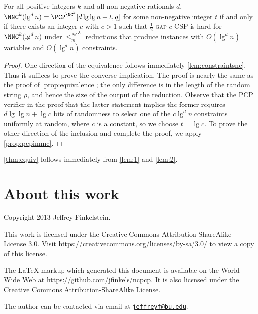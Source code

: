 \documentclass[]{article}
\newcommand{\email}[1]{\href{mailto:#1}{\nolinkurl{#1}}}
\begin{document}
\begin{lemma}\label{lem:2}
  For all positive integers $k$ and all non-negative rationals $d$, $\NNC^k(\lg^d n) = \PCP^{\NC^k}[d \lg \lg n + t, q]$ for some non-negative integer $t$ if and only if there exists an integer $c$ with $c > 1$ such that \textsc{$\frac{1}{2}$-gap $c$-CSP} is hard for $\NNC^k(\lg^d n)$ under $\leq_m^{NC^k}$ reductions that produce instances with $O(\lg^d n)$ variables and $O(\lg^d n)$ constraints.
\end{lemma}
\begin{proof}
  One direction of the equivalence follows immediately \autoref{lem:constraintsnc}.
  Thus it suffices to prove the converse implication.
  The proof is nearly the same as the proof of \autoref{prop:equivalence}; the only difference is in the length of the random string $\rho$, and hence the size of the output of the reduction.
  Observe that the PCP verifier in the proof that the latter statement implies the former requires $d \lg \lg n + \lg c$ bits of randomness to select one of the $c \lg^d n$ constraints uniformly at random, where $c$ is a constant, so we choose $t = \lg c$.
  To prove the other direction of the inclusion and complete the proof, we apply \autoref{prop:pcpinnnc}.
\end{proof}

\autoref{thm:equiv} follows immediately from \autoref{lem:1} and \autoref{lem:2}.

\section{About this work}

Copyright 2013 Jef{}frey Finkelstein.

This work is licensed under the Creative Commons Attribution-ShareAlike License 3.0.
Visit \mbox{\url{https://creativecommons.org/licenses/by-sa/3.0/}} to view a copy of this license.

The \LaTeX{} markup which generated this document is available on the World Wide Web at \mbox{\url{https://github.com/jfinkels/ncpcp}}.
It is also licensed under the Creative Commons Attribution-ShareAlike License.

The author can be contacted via email at \email{jeffreyf@bu.edu}.



\end{document}
